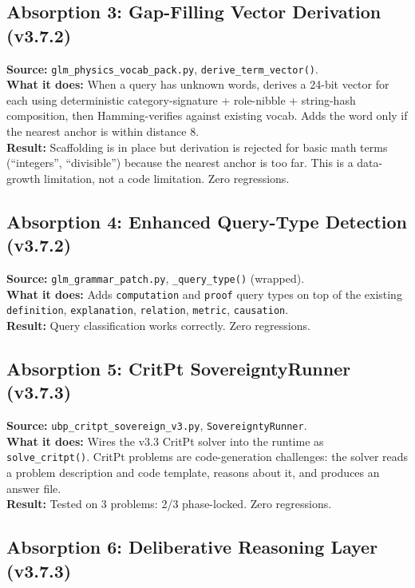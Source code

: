 \documentclass[11pt,a4paper]{article}
\begin{document}
\subsection{Absorption 3: Gap-Filling Vector Derivation (v3.7.2)}

\textbf{Source:} \texttt{glm\_physics\_vocab\_pack.py}, \texttt{derive\_term\_vector()}. \\
\textbf{What it does:} When a query has unknown words, derives a 24-bit vector for each using deterministic category-signature + role-nibble + string-hash composition, then Hamming-verifies against existing vocab. Adds the word only if the nearest anchor is within distance 8. \\
\textbf{Result:} Scaffolding is in place but derivation is rejected for basic math terms (``integers'', ``divisible'') because the nearest anchor is too far. This is a data-growth limitation, not a code limitation. Zero regressions.

\subsection{Absorption 4: Enhanced Query-Type Detection (v3.7.2)}

\textbf{Source:} \texttt{glm\_grammar\_patch.py}, \texttt{\_query\_type()} (wrapped). \\
\textbf{What it does:} Adds \texttt{computation} and \texttt{proof} query types on top of the existing \texttt{definition}, \texttt{explanation}, \texttt{relation}, \texttt{metric}, \texttt{causation}. \\
\textbf{Result:} Query classification works correctly. Zero regressions.

\subsection{Absorption 5: CritPt SovereigntyRunner (v3.7.3)}

\textbf{Source:} \texttt{ubp\_critpt\_sovereign\_v3.py}, \texttt{SovereigntyRunner}. \\
\textbf{What it does:} Wires the v3.3 CritPt solver into the runtime as \texttt{solve\_critpt()}. CritPt problems are code-generation challenges: the solver reads a problem description and code template, reasons about it, and produces an answer file. \\
\textbf{Result:} Tested on 3 problems: 2/3 phase-locked. Zero regressions.

\subsection{Absorption 6: Deliberative Reasoning Layer (v3.7.3)}
\end{document}
